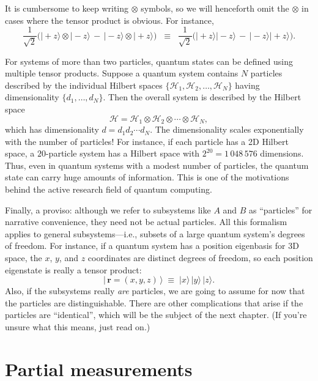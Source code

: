 \documentclass[pra,12pt]{revtex4}
\begin{document}
It is cumbersome to keep writing $\otimes$ symbols, so we will
henceforth omit the $\otimes$ in cases where the tensor product is
obvious.  For instance,
\begin{equation}
  \frac{1}{\sqrt{2}} \Big(|\!+\!z\rangle\otimes|\!-\!z\rangle \,-\, |\!-\!z\rangle\otimes|\!+\!z\rangle\Big) \;\;\equiv \;\; \frac{1}{\sqrt{2}} \Big(|\!+\!z\rangle|\!-\!z\rangle \,-\, |\!-\!z\rangle|\!+\!z\rangle\Big).
\end{equation}

For systems of more than two particles, quantum states can be defined
using multiple tensor products.  Suppose a quantum system contains $N$
particles described by the individual Hilbert spaces $\{\mathscr{H}_1,
\mathscr{H}_2, \dots, \mathscr{H}_N\}$ having dimensionality $\{d_1,
\dots, d_N\}$.  Then the overall system is described by the Hilbert
space
\begin{equation}
  \mathscr{H} = \mathscr{H}_1 \otimes \mathscr{H}_2 \otimes \cdots
  \otimes \mathscr{H}_N,
\end{equation}
which has dimensionality $d = d_1 d_2\cdots d_N$.  The dimensionality
scales exponentially with the number of particles!  For instance, if
each particle has a 2D Hilbert space, a $20$-particle system has a
Hilbert space with $2^{20} =1\,048\,576$ dimensions.  Thus, even in
quantum systems with a modest number of particles, the quantum state
can carry huge amounts of information.  This is one of the motivations
behind the active research field of quantum computing.

Finally, a proviso: although we refer to subsystems like $A$ and $B$
as ``particles'' for narrative convenience, they need not be actual
particles.  All this formalism applies to general subsystems---i.e.,
subsets of a large quantum system's degrees of freedom.  For instance,
if a quantum system has a position eigenbasis for 3D space, the $x$,
$y$, and $z$ coordinates are distinct degrees of freedom, so each
position eigenstate is really a tensor product:
\begin{equation*}
  |\,\mathbf{r} = (x,y,z)\,\rangle \;\equiv\; |x\rangle\, |y\rangle\, |z\rangle.
\end{equation*}
Also, if the subsystems really \textit{are} particles, we are going to
assume for now that the particles are distinguishable.  There are
other complications that arise if the particles are ``identical'',
which will be the subject of the next chapter.  (If you're unsure what
this means, just read on.)


\section{Partial measurements}
\label{sec:partialmeasurements}
\end{document}

